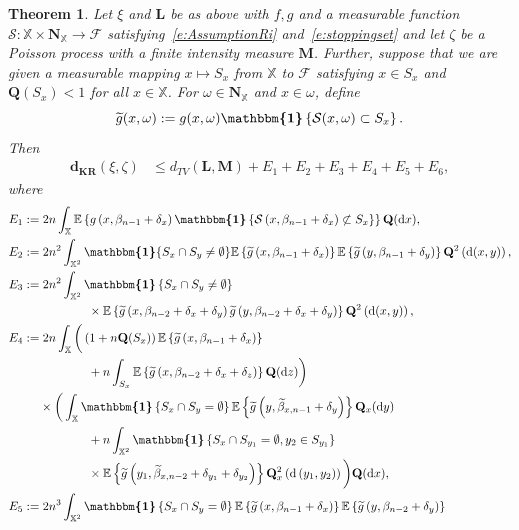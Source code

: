 \documentclass[10pt]{amsart}
\newtheorem{theo}{Theorem}[section]
\theoremstyle{definition}\newtheorem{defi}[theo]{Definition}\newtheorem{rema}[theo]{Remark}\newtheorem{exam}[theo]{Example}\newtheorem{exem}[theo]{Example}\newtheorem{nota}[theo]{Notation}
\newcommand*\bL{\mathbf{L}}
\newcommand*\bM{\mathbf{M}}
\newcommand*\bN{\mathbf{N}}
\newcommand{\bQ}{\mathbf{Q}}
\newcommand*\dkr{\mathbf{d_{KR}}}
\newcommand*\X{\mathbb{X}}
\newcommand{\E}{\mathbb{E}}
\newcommand*\cF{\mathcal{F}}
\newcommand*\cS{\mathcal{S}}
\newcommand*\md{\mathrm{d}}
\newcommand{\mean}[1] {\E\left\{{#1}\right\}}
\newcommand{\ind}{\boldsymbol{\mathbbm{1}}}
\newcommand{\set}[1]{\left\{#1\right\}}
\newcommand{\tg}{\tilde{g}}
\let\oldtilde\tilde
\renewcommand*{\tilde}[1]{\mathchoice{\widetilde{#1}}{\widetilde{#1}}{\oldtilde{#1}}{\oldtilde{#1}}}
\begin{document}
\begin{theo}\label{thm:binomial}
Let $\xi$ and $\bL$ be as above with $f,g$ and a measurable function $\cS: \X\times\bN_{\X}\to\cF$ satisfying~\eqref{e:AssumptionRi} and~\eqref{e:stoppingset} and let $\zeta$ be a Poisson process with a finite intensity measure $\bM$. Further, suppose that we are given a measurable mapping $x \mapsto S_{x}$ from $\X$ to $\cF$ satisfying $x \in S_{x}$ and $\bQ(S_x)<1$ for all $x\in\X$. For $\omega \in \bN_{\X}$ and $x \in \omega$, define
\[
\tg(x,\omega) := g(x,\omega)\ind\set{\cS(x,\omega) \subset S_{x}}.
\]
Then
\begin{align*}
\dkr(\xi,\zeta) & \leq d_{TV}(\bL,\bM) + E_1 + E_2 + E_3 + E_4 + E_5 + E_6,
\end{align*}
where
\begin{align*}
E_1 :=&\; 2n\int_{\X}\mean{g\left(x,\beta_{n-1}+\delta_{x}\right)\ind\set{\cS\left(x,\beta_{n-1}+\delta_{x}\right)\not \subset S_{x}}}\bQ(\md x), \allowdisplaybreaks\\
E_2 :=&\; 2n^2 \int_{\X^2} \ind\{S_x\cap S_y \neq \emptyset \} \mean{\tg\left(x,\beta_{n-1}+\delta_x\right)} \mean{\tg\left(y,\beta_{n-1}+\delta_y\right)} \bQ^2\left(\md(x,y)\right), \allowdisplaybreaks \\
E_3 :=&\; 2n^2 \int_{\X^2} \ind\left\{S_x\cap S_y \neq \emptyset \right\}\\
&\qquad\qquad \times\mean{\tg\left(x,\beta_{n-2}+\delta_x+\delta_y\right) \tg\left(y,\beta_{n-2}+\delta_x+\delta_y\right)} \bQ^2\left(\md(x,y)\right), \allowdisplaybreaks \\
E_4 :=&\; 2n\int_{\X} \bigg(\left(1+n\bQ(S_x)\right) \mean{\tg\left(x,\beta_{n-1}+\delta_x\right)}\\
&\qquad\qquad + n \int_{S_x} \mean{\tg\left(x,\beta_{n-2}+\delta_x+\delta_z\right)} \bQ(\md z) \bigg)\\
& \times \bigg(\int_{\X} \ind\left\{S_x\cap S_y=\emptyset\right\} \mean{\tg\left(y,\widetilde{\beta}_{x,n-1}+\delta_y\right)} \bQ_x(\md y)\\
& \qquad\qquad + n \int_{\X^2} \ind\left\{S_x\cap S_{y_1}=\emptyset, y_2\in S_{y_1}\right\}\\
&\qquad\qquad \times \mean{\tg\left(y_1,\widetilde{\beta}_{x,n-2}+\delta_{y_1}+\delta_{y_2}\right)} \bQ^2_x\left(\md\left(y_1,y_2\right)\right) \bigg) \bQ(\md x), \allowdisplaybreaks \\
E_5 :=&\; 2n^3 \int_{\X^2} \ind\left\{S_x\cap S_y=\emptyset\right\} \mean{\tg\left(x, \beta_{n-1}+\delta_x\right) } \mean{ \tg\left(y, \beta_{n-2}+\delta_y\right) }\\

\end{align*}
\end{theo}
\end{document}

